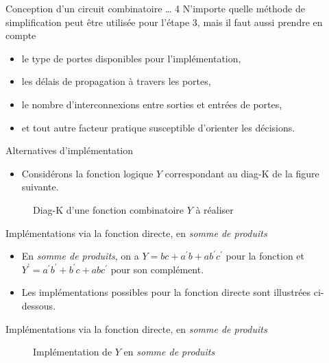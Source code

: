 \documentclass[presentation]{beamer}
\begin{document}
\begin{frame}[label={sec:orgd95efdb}]{Conception d'un circuit combinatoire \ldots{} 4}
N'importe quelle méthode de simplification peut être utilisée pour l'étape 3, mais il faut aussi prendre en compte 
\begin{itemize}
\item le type de portes disponibles pour l'implémentation,
\item les délais de propagation à travers les portes,
\item le nombre d'interconnexions entre sorties et entrées de portes,
\item et tout autre facteur pratique susceptible d'orienter les décisions.
\end{itemize}
\end{frame}

\begin{frame}[label={sec:org4fbbeaf}]{Alternatives d'implémentation}
\begin{itemize}
\item Considérons la fonction logique \(Y\) correspondant au diag-K de la figure suivante.
\end{itemize}

\begin{figure}[htbp]
\centering

\caption{\label{fig:org551e5f8}Diag-K d'une fonction combinatoire \(Y\) à réaliser}
\end{figure} 
\end{frame}

\begin{frame}[label={sec:orge32a79f}]{Implémentations via la fonction directe, en \emph{somme de produits}}
\begin{itemize}
\item En \emph{somme de produits}, on a \(Y = bc + a^\prime b + a b^\prime c^\prime\) pour la fonction et \(Y^\prime = a^\prime b^\prime + b^\prime c + a b c^\prime\) pour son complément.

\item Les implémentations possibles pour la fonction directe sont illustrées ci-dessous.
\end{itemize}
\end{frame}

\begin{frame}[label={sec:orgf4512f9}]{Implémentations via la fonction directe, en \emph{somme de produits}}
\begin{figure}[htbp]
\centering

\caption{\label{fig:orgca9080f}Implémentation de \(Y\) en \emph{somme de produits}}
\end{figure} 
\end{frame}
\end{document}
